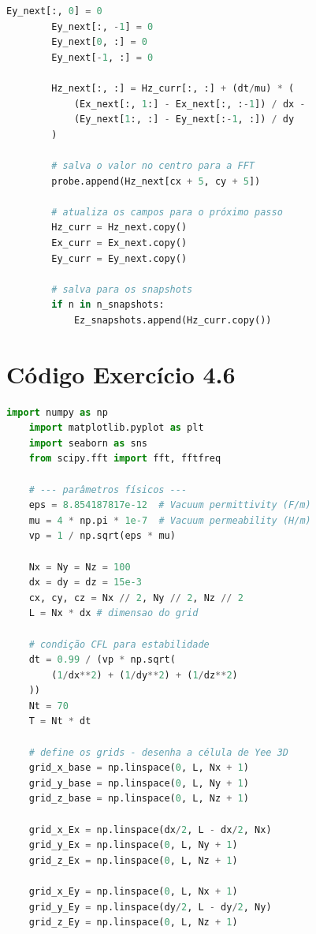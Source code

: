 \begin{anexosenv}
\begin{lstlisting}[language=Python, breaklines=true, basicstyle=\tiny]
        Ey_next[:, 0] = 0
        Ey_next[:, -1] = 0
        Ey_next[0, :] = 0
        Ey_next[-1, :] = 0

        Hz_next[:, :] = Hz_curr[:, :] + (dt/mu) * (
            (Ex_next[:, 1:] - Ex_next[:, :-1]) / dx -
            (Ey_next[1:, :] - Ey_next[:-1, :]) / dy
        )

        # salva o valor no centro para a FFT
        probe.append(Hz_next[cx + 5, cy + 5])

        # atualiza os campos para o próximo passo
        Hz_curr = Hz_next.copy()
        Ex_curr = Ex_next.copy()
        Ey_curr = Ey_next.copy()

        # salva para os snapshots
        if n in n_snapshots:
            Ez_snapshots.append(Hz_curr.copy())

    \end{lstlisting}

    \chapter{Código Exercício 4.6}\label{cap:codigo_ex4-6}

    \begin{lstlisting}[language=Python, breaklines=true, basicstyle=\tiny]
    import numpy as np
    import matplotlib.pyplot as plt
    import seaborn as sns
    from scipy.fft import fft, fftfreq

    # --- parâmetros físicos ---
    eps = 8.854187817e-12  # Vacuum permittivity (F/m)
    mu = 4 * np.pi * 1e-7  # Vacuum permeability (H/m)
    vp = 1 / np.sqrt(eps * mu)

    Nx = Ny = Nz = 100
    dx = dy = dz = 15e-3
    cx, cy, cz = Nx // 2, Ny // 2, Nz // 2
    L = Nx * dx # dimensao do grid

    # condição CFL para estabilidade
    dt = 0.99 / (vp * np.sqrt(
        (1/dx**2) + (1/dy**2) + (1/dz**2)
    ))
    Nt = 70
    T = Nt * dt

    # define os grids - desenha a célula de Yee 3D
    grid_x_base = np.linspace(0, L, Nx + 1)
    grid_y_base = np.linspace(0, L, Ny + 1)
    grid_z_base = np.linspace(0, L, Nz + 1)

    grid_x_Ex = np.linspace(dx/2, L - dx/2, Nx)
    grid_y_Ex = np.linspace(0, L, Ny + 1)
    grid_z_Ex = np.linspace(0, L, Nz + 1)

    grid_x_Ey = np.linspace(0, L, Nx + 1)
    grid_y_Ey = np.linspace(dy/2, L - dy/2, Ny)
    grid_z_Ey = np.linspace(0, L, Nz + 1)


\end{lstlisting}
\end{anexosenv}
